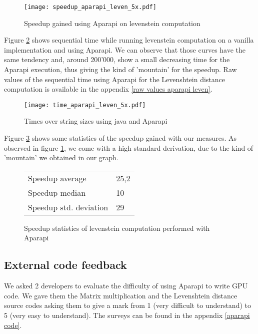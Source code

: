 \begin{figure}[H]
\centering
\texttt{[image: speedup\_aparapi\_leven\_5x.pdf]}
\caption{Speedup gained using Aparapi on levenstein computation}
\label{fig plot leven aparapi}
\end{figure}

Figure \ref{fig: plot aparapi leven times} shows sequential time while running levenstein computation on a vanilla implementation and using Aparapi. We can observe that those curves have the same tendency and, around 200'000, show a small decreasing time for the Aparapi execution, thus giving the kind of 'mountain' for the speedup. Raw values of the sequential time using Aparapi for the Levenshtein distance computation is available in the appendix \ref{raw values aparapi leven}.

\begin{figure}[H]
\centering
\texttt{[image: time\_aparapi\_leven\_5x.pdf]}
\caption{Times over string sizes using java and Aparapi}
\label{fig: plot aparapi leven times}
\end{figure}

Figure \ref{fig table leven aparapi} shows some statistics of the speedup gained with our measures. As observed in figure \ref{fig plot leven aparapi}, we come with a high standard derivation, due to the kind of 'mountain' we obtained in our graph.

\begin{figure}[H]
\begin{center}
\begin{tabular}{ |l|l| } 
 \hline
 Speedup average & 25,2 \\ 
 Speedup median & 10 \\ 
 Speedup std. deviation & 29 \\ 
 \hline
\end{tabular}
\end{center}
\caption{Speedup statistics of levenstein computation performed with Aparapi}
\label{fig table leven aparapi}
\end{figure}

\subsection{External code feedback}

We asked 2 developers to evaluate the difficulty of using Aparapi to write GPU code. We gave them the Matrix multiplication and the Levenshtein distance source codes asking them to give a mark from 1 (very difficult to understand) to 5 (very easy to understand). The surveys can be found in the appendix \ref{aparapi code}.

